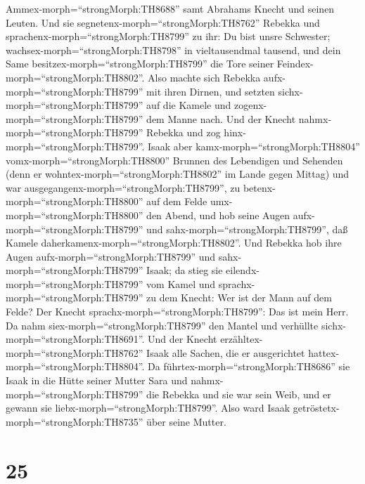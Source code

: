 Ammex-morph=``strongMorph:TH8688'' samt Abrahams Knecht und seinen
Leuten.  Und sie segnetenx-morph=``strongMorph:TH8762''
Rebekka und sprachenx-morph=``strongMorph:TH8799'' zu ihr: Du bist unsre
Schwester; wachsex-morph=``strongMorph:TH8798'' in vieltausendmal
tausend, und dein Same besitzex-morph=``strongMorph:TH8799'' die Tore
seiner Feindex-morph=``strongMorph:TH8802''.  Also machte
sich Rebekka aufx-morph=``strongMorph:TH8799'' mit ihren Dirnen, und
setzten sichx-morph=``strongMorph:TH8799'' auf die Kamele und
zogenx-morph=``strongMorph:TH8799'' dem Manne nach. Und der Knecht
nahmx-morph=``strongMorph:TH8799'' Rebekka und zog
hinx-morph=``strongMorph:TH8799''.  Isaak aber
kamx-morph=``strongMorph:TH8804'' vomx-morph=``strongMorph:TH8800''
Brunnen des Lebendigen und Sehenden (denn er
wohntex-morph=``strongMorph:TH8802'' im Lande gegen Mittag)
 und war ausgegangenx-morph=``strongMorph:TH8799'', zu
betenx-morph=``strongMorph:TH8800'' auf dem Felde
umx-morph=``strongMorph:TH8800'' den Abend, und hob seine Augen
aufx-morph=``strongMorph:TH8799'' und sahx-morph=``strongMorph:TH8799'',
daß Kamele daherkamenx-morph=``strongMorph:TH8802''.  Und
Rebekka hob ihre Augen aufx-morph=``strongMorph:TH8799'' und
sahx-morph=``strongMorph:TH8799'' Isaak; da stieg sie
eilendx-morph=``strongMorph:TH8799'' vom Kamel  und
sprachx-morph=``strongMorph:TH8799'' zu dem Knecht: Wer ist der Mann auf
dem Felde? Der Knecht sprachx-morph=``strongMorph:TH8799'': Das ist mein
Herr. Da nahm siex-morph=``strongMorph:TH8799'' den Mantel und verhüllte
sichx-morph=``strongMorph:TH8691''.  Und der Knecht
erzähltex-morph=``strongMorph:TH8762'' Isaak alle Sachen, die er
ausgerichtet hattex-morph=``strongMorph:TH8804''.  Da
führtex-morph=``strongMorph:TH8686'' sie Isaak in die Hütte seiner
Mutter Sara und nahmx-morph=``strongMorph:TH8799'' die Rebekka und sie
war sein Weib, und er gewann sie liebx-morph=``strongMorph:TH8799''.
Also ward Isaak getröstetx-morph=``strongMorph:TH8735'' über seine
Mutter.

\hypertarget{section-24}{%
\section{25}\label{section-24}}

